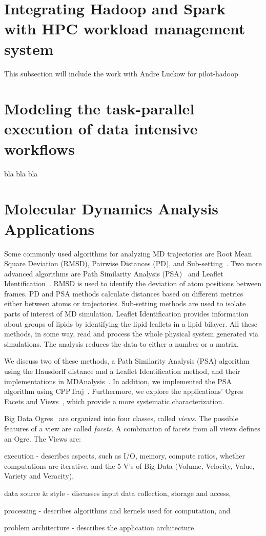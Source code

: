 \label{data_hpc}
\section{Integrating Hadoop and Spark with HPC workload management system}
\label{hadoop-pilot}
This subsection will include the work with Andre Luckow for pilot-hadoop

\section{Modeling the task-parallel execution of data intensive workflows}
\label{task-par}
bla bla bla
\section{Molecular Dynamics Analysis Applications}
\label{use_cases}
Some commonly used algorithms for analyzing MD trajectories are Root Mean Square Deviation (RMSD), Pairwise Distances (PD), and Sub-setting~\cite{mura2014biomolecules}.
Two more advanced algorithms are Path Similarity Analysis (PSA)~\cite{seyler2015path} and Leaflet Identification~\cite{michaud2011mdanalysis}.
RMSD is used to identify the deviation of atom positions between frames.
PD and PSA methods calculate distances based on different metrics either between atoms or trajectories.
Sub-setting methods are used to isolate parts of interest of MD simulation.
Leaflet Identification provides information about groups of lipids by identifying the lipid leaflets in a lipid bilayer.
All these methods, in some way, read and process the whole physical system generated via simulations.
The analysis reduces the data to either a number or a matrix.

We discuss two of these methods, a Path Similarity Analysis (PSA) algorithm using the Hausdorff distance and a Leaflet Identification method, and their implementations in MDAnalysis~\cite{michaud2011mdanalysis,gowers2016mdanalysis}.
In addition, we implemented the PSA algorithm using CPPTraj~\cite{roe2013ptraj}.
Furthermore, we explore the applications' Ogres Facets and Views~\cite{fox2014towards}, which provide a more systematic characterization.

Big Data Ogres~\cite{fox2014towards} are organized into four classes, called \emph{views}. 
The possible features of a view are called \emph{facets}.
A combination of facets from all views defines an Ogre.
The Views are: 
\begin{inparaenum}[1)]
    \item execution - describes aspects, such as I/O, memory, compute ratios, whether computations are iterative, and the 5 V's of Big Data (Volume, Velocity, Value, Variety and Veracity),
    \item data source \& style - discusses input data collection, storage and access,
    \item processing - describes algorithms and kernels used for computation, and
    \item problem architecture - describes the application architecture.
\end{inparaenum}


